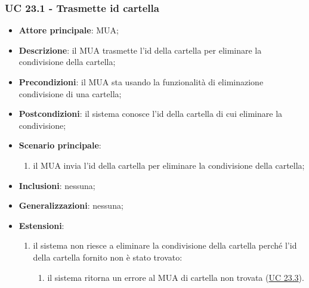     \subsubsection{UC 23.1 - Trasmette id cartella} \label{sec:UC23.1}
    \begin{itemize}
        \item \textbf{Attore principale}: MUA;
        \item \textbf{Descrizione}: il MUA trasmette l'id della cartella per eliminare la condivisione della cartella;
        \item \textbf{Precondizioni}: il MUA sta usando la funzionalità di eliminazione condivisione di una cartella;
        \item \textbf{Postcondizioni}: il sistema conosce l'id della cartella di cui eliminare la condivisione;
        \item \textbf{Scenario principale}:
            \begin{enumerate}
                \item il MUA invia l'id della cartella per eliminare la condivisione della cartella;
            \end{enumerate}
        \item \textbf{Inclusioni}: nessuna;
        \item \textbf{Generalizzazioni}: nessuna;
        \item \textbf{Estensioni}:
            \begin{enumerate}[label=\alph*.]
                \item il sistema non riesce a eliminare la condivisione della cartella perché l'id della cartella fornito non è stato trovato:
                \begin{enumerate}[label=\arabic*.]
                    \item il sistema ritorna un errore al MUA di cartella non trovata (\hyperref[sec:UC23.3]{UC 23.3}).
                \end{enumerate}
            \end{enumerate}
    \end{itemize}


